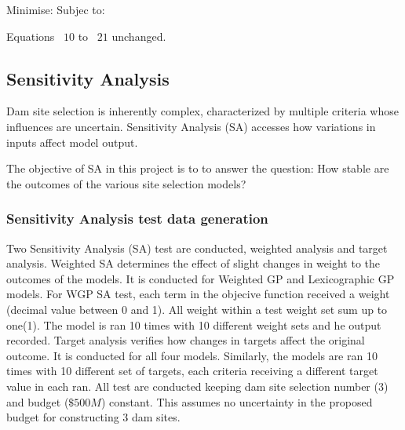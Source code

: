 Minimise:
              \EqEGPObjectiveThirtyThree
Subjec to:
              \EqMCWGPPopulationConstraintFourtyTwo   
              \EqMCWGPResidenceConstraintFourtyThree
              \EqMCWGPFarmlandDistanceConstraintFourtyFour
              \EqMCWGPNearestRoadConstraintFourtyFive
              \EqMCWGPFarmlandAreaConstraintFourtySix
              \begin{center}
                      Equations ~$10$ to ~$21$ unchanged.
              \end{center}
              \EqSelectThreeDamsTwentyTwo
              \EqBudgetConstraintTwentyThree
              \EqDConstraintOneNTwentyFour
              \EqDConstraintTwoNTwentyFive
              \EqDConstraintThreeNTwentySix
              \EqDConstraintFourNTwentySix
              \EqDConstraintFiveNTwentySeven
              \EqDConstraintSixNTwentyEight
              \EqDConstraintSevenNTwentyNine
              \EqDConstraintEightNThirty
              \EqDConstraintNineNThirtyOne
              \EqDConstraintTenNThirtyTwo

\subsection{Sensitivity Analysis}
Dam site selection is inherently complex, characterized by multiple criteria whose influences are uncertain. Sensitivity Analysis (SA) accesses how variations in inputs affect model output\cite{Jakub2023}.

The objective of SA in this project is to to answer the question: How stable are the outcomes of the various site selection models?

\subsubsection{Sensitivity Analysis test data generation}
Two Sensitivity Analysis (SA) test are conducted, weighted analysis and target analysis. Weighted SA determines the effect of slight changes in weight to the outcomes of the models. It is conducted for Weighted GP and Lexicographic GP models. For WGP SA test, each term in the objecive function received a weight (decimal value between 0 and 1). All weight within a test weight set sum up to one(1). The model is ran 10 times with 10 different weight sets and he output recorded. Target analysis verifies how changes in targets affect the original outcome. It is conducted for all four models. Similarly, the models are ran 10 times with 10 different set of targets, each criteria receiving a different target value in each ran. All test are conducted keeping dam site selection number (3) and budget ($\$500M$) constant. This assumes no uncertainty in the proposed budget for constructing 3 dam sites.

